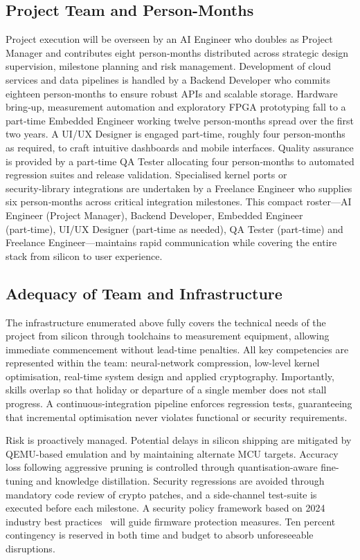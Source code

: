 \subsection{Project Team and Person-Months}
Project execution will be overseen by an AI Engineer who doubles as Project Manager and contributes eight person‑months distributed across strategic design supervision, milestone planning and risk management. Development of cloud services and data pipelines is handled by a Backend Developer who commits eighteen person‑months to ensure robust APIs and scalable storage. Hardware bring‑up, measurement automation and exploratory FPGA prototyping fall to a part‑time Embedded Engineer working twelve person‑months spread over the first two years. A UI/UX Designer is engaged part‑time, roughly four person‑months as required, to craft intuitive dashboards and mobile interfaces. Quality assurance is provided by a part‑time QA Tester allocating four person‑months to automated regression suites and release validation. Specialised kernel ports or security‑library integrations are undertaken by a Freelance Engineer who supplies six person‑months across critical integration milestones. This compact roster—AI Engineer (Project Manager), Backend Developer, Embedded Engineer (part‑time), UI/UX Designer (part‑time as needed), QA Tester (part‑time) and Freelance Engineer—maintains rapid communication while covering the entire stack from silicon to user experience.


\subsection{Adequacy of Team and Infrastructure}
The infrastructure enumerated above fully covers the technical needs of the project from silicon through toolchains to measurement equipment, allowing immediate commencement without lead-time penalties. All key competencies are represented within the team: neural-network compression, low-level kernel optimisation, real-time system design and applied cryptography. Importantly, skills overlap so that holiday or departure of a single member does not stall progress. A continuous-integration pipeline enforces regression tests, guaranteeing that incremental optimisation never violates functional or security requirements.

Risk is proactively managed. Potential delays in silicon shipping are mitigated by QEMU-based emulation and by maintaining alternate MCU targets. Accuracy loss following aggressive pruning is controlled through quantisation-aware fine-tuning and knowledge distillation. Security regressions are avoided through mandatory code review of crypto patches, and a side-channel test-suite is executed before each milestone. A security policy framework based on 2024 industry best practices~\cite{embedded2024iotsecurity} will guide firmware protection measures. Ten percent contingency is reserved in both time and budget to absorb unforeseeable disruptions.

